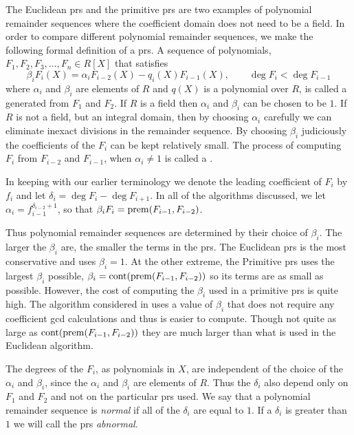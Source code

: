 The Euclidean {\sc prs} and the primitive {\sc prs} are two examples
of polynomial remainder sequences where the coefficient domain does
not need to be a field.  In order to compare different polynomial
remainder sequences, we make the following formal definition of a {\sc
prs}.  A sequence of polynomials, $F_1, F_2, F_3, \ldots, F_n \in
R[X]$ that satisfies
\[
\beta_i F_i(X) = \alpha_i F_{i-2}(X) - q_i(X) F_{i-1}(X), 
  \qquad \deg F_i < \deg F_{i-1}
\]
where $\alpha_i$ and $\beta_i$ are elements of $R$ and $q(X)$ is a
polynomial over $R$, is called a 
generated from $F_1$ and $F_2$.  If $R$ is a field then $\alpha_i$ and
$\beta_i$ can be chosen to be $1$.  If $R$ is not a field, but an
integral domain, then by choosing $\alpha_i$ carefully we can
eliminate inexact divisions in the remainder sequence.  By choosing
$\beta_i$ judiciously the coefficients of the $F_i$ can be kept
relatively small.  The process of computing $F_i$ from $F_{i-2}$ and
$F_{i-1}$, when $\alpha_i \not= 1$ is called a .

In keeping with our earlier terminology we denote the leading
coefficient of $F_i$ by $f_i$ and let $\delta_i = \deg F_i- \deg
F_{i+1}$.  In all of the algorithms discussed, we let $\alpha_{i} =
f_{i-1}^{\delta_{i-2}+1}$, so that $\beta_{i} F_{i} = \mathop{\rm prem}\nolimits(F_{i-1},
F_{i-2})$. 

Thus polynomial remainder sequences are determined by their choice of
$\beta_{i}$.  The larger the $\beta_{i}$ are, the smaller the terms in
the {\sc prs}.  The Euclidean {\sc prs} is the most conservative and
uses $\beta_i = 1$.  At the other extreme, the Primitive {\sc prs}
uses the largest $\beta_{i}$ possible, $\beta_i = \mathop{\rm cont}\nolimits(
\mathop{\rm prem}\nolimits(F_{i-1},F_{i-2}))$ so its terms are as small as possible.
However, the cost of computing the $\beta_i$ used in a primitive {\sc
prs} is quite high.  The algorithm considered in
 uses a value of $\beta_i$ that does not
require any coefficient {\sc gcd} calculations and thus is easier to
compute.  Though not quite as large as $\mathop{\rm cont}\nolimits(\mathop{\rm prem}\nolimits(F_{i-1},
F_{i-2}))$ they are much larger than what is used in the Euclidean
algorithm.

The degrees of the $F_i$, as polynomials in $X$, are independent of
the choice of the $\alpha_i$ and $\beta_i$, since the $\alpha_{i}$ and
$\beta_{i}$ are elements of $R$.  Thus the $\delta_{i}$ also depend
only on $F_{1}$ and $F_{2}$ and not on the particular {\sc prs} used.  We
say that a polynomial remainder sequence is {\em
normal} if all of the
$\delta_i$ are equal to $1$.  If a $\delta_i$ is greater than $1$ we
will call the {\sc prs} {\em abnormal\/}.

